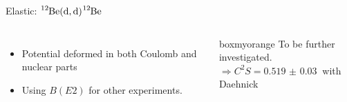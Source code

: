 \documentclass[sans,
frameno, %
mp,
usenames,dvipsnames, %
onlytextwidth, %
t,%
11pt]{beamer}
\newcommand{\iso}[2]{\ce{^{#1}#2}}
\begin{document}
\begin{frame}{Elastic: $\iso{12}{Be}(\textrm{d}, \textrm{d})\iso{12}{Be}$}
{\begin{figure}
\begin{minipage}[t]{0.48\linewidth}
            \end{minipage}
        \end{figure}
        \begin{columns}
            {
                \begin{itemize}
                    \item Potential deformed in both Coulomb and nuclear parts
                    \item Using $B(E2)$ for other experiments.
                \end{itemize}
            }\hfill
            {

                \begin{beamercolorbox}[sep=1ex, center, rounded=true]{boxmyorange}
                    To be further investigated. \\
                    $\Rightarrow C^2S = \qty{0.519(30)}{}$ with Daehnick
                \end{beamercolorbox}

            }
        \end{columns}
    }
\end{frame}
\end{document}
